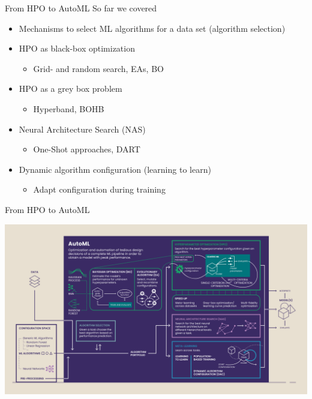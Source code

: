 

\usepackage[normalem]{ulem}
\usepackage{pifont}
\usepackage{relsize}
\renewcommand{\lit}[1]{{\smaller\color{black!60}[#1]}}
\subtitle{Wrap Up}




\maketitle



\begin{frame}{From HPO to AutoML}
  So far we covered
  \begin{itemize}
    \item Mechanisms to select ML algorithms for a data set (algorithm selection)
    \item HPO as black-box optimization
    \begin{itemize}
      \item Grid- and random search, EAs, BO
    \end{itemize}
    \item HPO as a grey box problem
    \begin{itemize}
      \item Hyperband, BOHB
    \end{itemize}
    \item Neural Architecture Search (NAS)
    \begin{itemize}
      \item One-Shot approaches, DART
    \end{itemize}
    \item Dynamic algorithm configuration (learning to learn)
    \begin{itemize}
      \item Adapt configuration during training
    \end{itemize}
  \end{itemize}  
\end{frame}

\begin{frame}{From HPO to AutoML}
    \begin{center}
      \includegraphics[width = 0.9\linewidth]{images/18_AutoML-Components-Overview-Infographic_corrected.png}  
    \end{center}
\end{frame}

